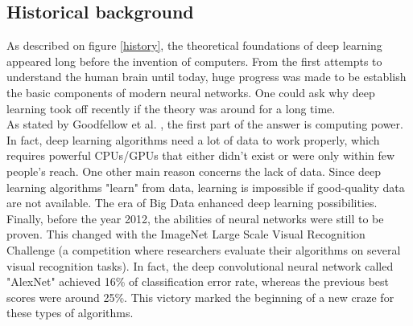 \subsection{Historical background}
\label{historical_background}
As described on figure \ref{history}, the theoretical foundations of deep learning appeared long before the invention of computers. From the first attempts to understand the human brain until today, huge progress was made to be establish the basic components of modern neural networks. One could ask why deep learning took off recently if the theory was around for a long time.\\
As stated by Goodfellow et al. \cite{15}, the first part of the answer is computing power. In fact, deep learning algorithms need a lot of data to work properly, which requires powerful CPUs/GPUs that either didn't exist or were only within few people's reach. One other main reason concerns the lack of data. Since deep learning algorithms "learn" from data, learning is impossible if good-quality data are not available. The era of Big Data enhanced deep learning possibilities. 
Finally, before the year 2012, the abilities of neural networks were still to be proven. This changed with the ImageNet Large Scale Visual Recognition Challenge (a competition where researchers evaluate their algorithms on several visual recognition tasks). In fact, the deep convolutional neural network called "AlexNet" achieved 16\% of classification error rate, whereas the previous best scores were around 25\%. This victory marked the beginning of a new craze for these types of algorithms.


